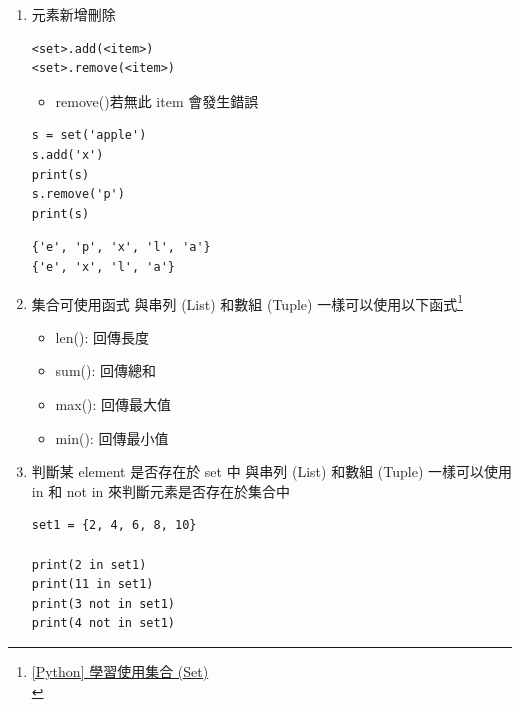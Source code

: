\documentclass[a4paper,12pt]{article}
\begin{document}
\begin{enumerate}
\item 元素新增刪除
\label{sec:org16db2b6}
\lstset{breaklines=true,language=Python,label= ,caption= ,captionpos=b,firstnumber=1,numbers=left}
\begin{lstlisting}
<set>.add(<item>)
<set>.remove(<item>)
\end{lstlisting}
\begin{itemize}
\item remove()若無此 item 會發生錯誤\\
\end{itemize}
\lstset{breaklines=true,language=Python,label= ,caption= ,captionpos=b,firstnumber=1,numbers=left}
\begin{lstlisting}
s = set('apple')
s.add('x')
print(s)
s.remove('p')
print(s)
\end{lstlisting}

\begin{verbatim}
{'e', 'p', 'x', 'l', 'a'}
{'e', 'x', 'l', 'a'}
\end{verbatim}

\item 集合可使用函式
\label{sec:org7ef62f6}
與串列 (List) 和數組 (Tuple) 一樣可以使用以下函式\footnote{\href{https://wenyuangg.github.io/posts/python3/python-set.html}{[Python] 學習使用集合 (Set)}\\}\\
\begin{itemize}
\item len(): 回傳長度\\
\item sum(): 回傳總和\\
\item max(): 回傳最大值\\
\item min(): 回傳最小值\\
\end{itemize}

\item 判斷某 element 是否存在於 set 中
\label{sec:org67c1890}
與串列 (List) 和數組 (Tuple) 一樣可以使用 in 和 not in 來判斷元素是否存在於集合中\\
\lstset{breaklines=true,language=Python,label= ,caption= ,captionpos=b,firstnumber=1,numbers=left}
\begin{lstlisting}
set1 = {2, 4, 6, 8, 10}

print(2 in set1)
print(11 in set1)
print(3 not in set1)
print(4 not in set1)

\end{lstlisting}


\end{enumerate}
\end{document}
